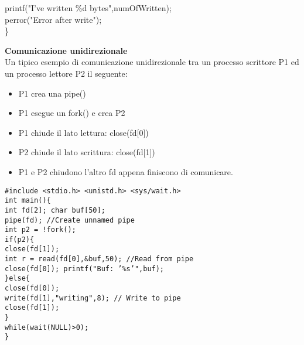 \begin{flushleft}
\begin{flushleft}
\begin{flushleft}
\begin{flushleft}
{                \halftab printf("I've written \%d bytes\n",numOfWritten);\\
                \halftab perror("Error after write");\\
        \} }
      \end{flushleft}
    \end{flushleft}
    \begin{flushleft}
      \textbf{Comunicazione unidirezionale}\\
      Un tipico esempio di comunicazione unidirezionale tra un processo scrittore P1 ed un 
      processo lettore P2 \ace il seguente:
      \begin{itemize}
        \item P1 crea una pipe()
        \item P1 esegue un fork() e crea P2
        \item P1 chiude il lato lettura: close(fd[0])
        \item P2 chiude il lato scrittura: close(fd[1])
        \item P1 e P2 chiudono l'altro fd appena finiscono di comunicare.
      \end{itemize}
      \begin{flushleft}
        \texttt{\#include <stdio.h> <unistd.h> <sys/wait.h>\\
                int main()\{ \\
                \halftab int fd[2]; char buf[50];\\
                \halftab pipe(fd); //Create unnamed pipe\\
                \halftab int p2 = !fork();\\
                \halftab if(p2)\{\\
                \tab close(fd[1]);\\
                \tab int r = read(fd[0],\&buf,50); //Read from pipe\\
                \tab close(fd[0]); printf("Buf: '\%s'\n",buf);\\
                \halftab \}else\{\\
                \tab close(fd[0]);\\
                \tab write(fd[1],"writing",8); // Write to pipe\\
                \tab close(fd[1]);\\
                \halftab \}\\
                \halftab while(wait(NULL)>0);\\
        \}}

\end{flushleft}
\end{flushleft}
\end{flushleft}
\end{flushleft}
